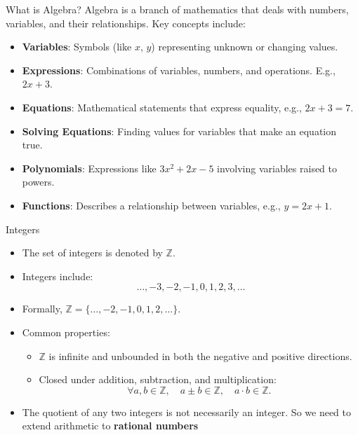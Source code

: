 \documentclass{beamer}
\begin{document}
  \begin{frame}{What is Algebra?}
    Algebra is a branch of mathematics that deals with numbers, variables, and their relationships. Key concepts include:
    
    \begin{itemize}
        \item \textbf{Variables}: Symbols (like \( x \), \( y \)) representing unknown or changing values.
        \item \textbf{Expressions}: Combinations of variables, numbers, and operations. E.g., \( 2x + 3 \).
        \item \textbf{Equations}: Mathematical statements that express equality, e.g., \( 2x + 3 = 7 \).
        \item \textbf{Solving Equations}: Finding values for variables that make an equation true.
        \item \textbf{Polynomials}: Expressions like \( 3x^2 + 2x - 5 \) involving variables raised to powers.
        \item \textbf{Functions}: Describes a relationship between variables, e.g., \( y = 2x + 1 \).
    \end{itemize}
\end{frame}


  \begin{frame}{Integers}
    \begin{itemize}
        \item The set of integers is denoted by \(\mathbb{Z}\).
        \item Integers include:
        \[
          \ldots, -3, -2, -1, 0, 1, 2, 3, \ldots
        \]
        \item Formally, \(\mathbb{Z} = \{\dots, -2, -1, 0, 1, 2, \dots\}\).
        \item Common properties:
        \begin{itemize}
            \item \(\mathbb{Z}\) is infinite and unbounded in both the negative and positive directions.
            \item Closed under addition, subtraction, and multiplication:
                \[
                  \forall a, b \in \mathbb{Z}, \quad
                  a \pm b \in \mathbb{Z}, \quad
                  a \cdot b \in \mathbb{Z}.
                \]
        \end{itemize}
        \item The quotient of any two integers is not necessarily an integer. So we need to extend arithmetic to \textbf{rational numbers}
    \end{itemize}
\end{frame}
\end{document}
